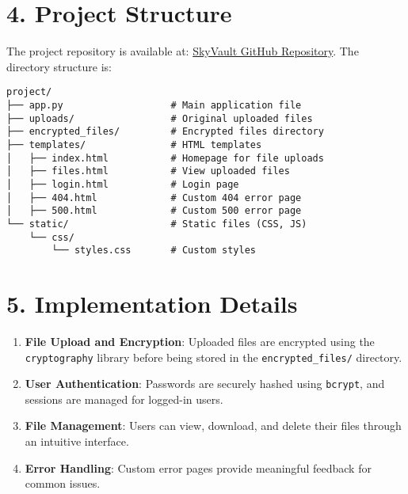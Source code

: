 \documentclass[12pt,a4paper]{article}
\begin{document}
\section*{4. Project Structure}
The project repository is available at: \href{https://github.com/PriyanshuKSharma/SkyVault.git}{SkyVault GitHub Repository}. The directory structure is:

\begin{tcolorbox}[colback=blue!5!white, colframe=blue!75!black, sharp corners, boxrule=0.5mm]
\begin{Verbatim}
project/
├── app.py                   # Main application file
├── uploads/                 # Original uploaded files
├── encrypted_files/         # Encrypted files directory
├── templates/               # HTML templates
│   ├── index.html           # Homepage for file uploads
│   ├── files.html           # View uploaded files
│   ├── login.html           # Login page
│   ├── 404.html             # Custom 404 error page
│   ├── 500.html             # Custom 500 error page
└── static/                  # Static files (CSS, JS)
    └── css/
        └── styles.css       # Custom styles
\end{Verbatim}
\end{tcolorbox}

\section*{5. Implementation Details}
\begin{enumerate}[label=\arabic*.]
    \item \textbf{File Upload and Encryption}:
    Uploaded files are encrypted using the \texttt{cryptography} library before being stored in the \texttt{encrypted\_files/} directory.
    \item \textbf{User Authentication}:
    Passwords are securely hashed using \texttt{bcrypt}, and sessions are managed for logged-in users.
    \item \textbf{File Management}:
    Users can view, download, and delete their files through an intuitive interface.
    \item \textbf{Error Handling}:
    Custom error pages provide meaningful feedback for common issues.
\end{enumerate}
\end{document}
